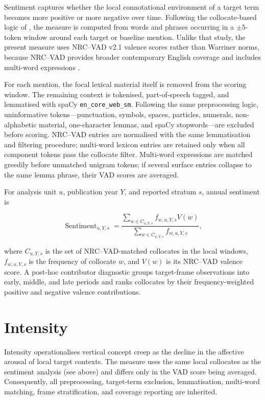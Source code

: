 Sentiment captures whether the local connotational environment of a target term becomes more positive or more negative over time. Following the collocate-based logic of \citet{baesMultidimensionalFrameworkEvaluating2024}, the measure is computed from words and phrases occurring in a \(\pm 5\)-token window around each target or baseline mention. Unlike that study, the present measure uses NRC--VAD v2.1 valence scores rather than Warriner norms, because NRC--VAD provides broader contemporary English coverage and includes multi-word expressions \citep{mohammadNRCVADLexicon2025}.

For each mention, the focal lexical material itself is removed from the scoring window. The remaining context is tokenised, part-of-speech tagged, and lemmatised with spaCy \texttt{en\_core\_web\_sm}. Following the same preprocessing logic, uninformative tokens---punctuation, symbols, spaces, particles, numerals, non-alphabetic material, one-character lemmas, and spaCy stopwords---are excluded before scoring. NRC--VAD entries are normalised with the same lemmatisation and filtering procedure; multi-word lexicon entries are retained only when all component tokens pass the collocate filter. Multi-word expressions are matched greedily before unmatched unigram tokens; if several surface entries collapse to the same lemma phrase, their VAD scores are averaged.

For analysis unit \(u\), publication year \(Y\), and reported stratum \(s\), annual sentiment is

\begin{equation}
\operatorname{Sentiment}_{u,Y,s}
=
\frac{
\sum_{w \in C_{u,Y,s}} f_{w,u,Y,s} V(w)
}{
\sum_{w \in C_{u,Y,s}} f_{w,u,Y,s}
},
\end{equation}

\noindent where \(C_{u,Y,s}\) is the set of NRC--VAD-matched collocates in the local windows, \(f_{w,u,Y,s}\) is the frequency of collocate \(w\), and \(V(w)\) is its NRC--VAD valence score. A post-hoc contributor diagnostic groups target-frame observations into early, middle, and late periods and ranks collocates by their frequency-weighted positive and negative valence contributions.

\section{Intensity}

Intensity operationalises vertical concept creep as the decline in the affective arousal of local target contexts. The measure uses the same local collocates as the sentiment analysis (see above) and differs only in the VAD score being averaged. Consequently, all preprocessing, target-term exclusion, lemmatisation, multi-word matching, frame stratification, and coverage reporting are inherited.

